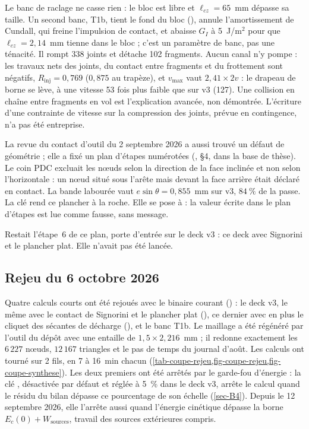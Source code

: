 Le banc de raclage ne casse rien : le bloc est libre et $\ell_{cz} = 65$~mm dépasse sa taille. Un second banc, T1b, tient le fond du bloc (), annule l'amortissement de Cundall, qui freine l'impulsion de contact, et abaisse $G_I$ à 5~J/m$^2$ pour que $\ell_{cz} = 2{,}14$~mm tienne dans le bloc ; c'est un paramètre de banc, pas une ténacité. Il rompt 338 joints et détache 102 fragments. Aucun canal n'y pompe : les travaux nets des joints, du contact entre fragments et du frottement sont négatifs, $R_\text{inj} = 0{,}769$ ($0{,}875$ au trapèze), et $v_\text{max}$ vaut $2{,}41 \times 2v$ : le drapeau de borne se lève, à une vitesse 53 fois plus faible que sur v3 (127). Une collision en chaîne entre fragments en vol est l'explication avancée, non démontrée. L'écriture d'une contrainte de vitesse sur la compression des joints, prévue en contingence, n'a pas été entreprise.

La revue du contact d'outil du 2 septembre 2026 a aussi trouvé un défaut de géométrie ; elle a fixé un plan d'étapes numérotées (, §4, dans la base de thèse). Le coin PDC excluait les nœuds selon la direction de la face inclinée et non selon l'horizontale : un nœud situé sous l'arête mais devant la face arrière était déclaré en contact. La bande labourée vaut $e\sin\theta = 0{,}855$~mm sur v3, $84~\%$ de la passe. La clé  rend ce plancher à la roche. Elle se pose à  : la valeur  écrite dans le plan d'étapes est lue comme fausse, sans message.

Restait l'étape~6 de ce plan, porte d'entrée sur le deck v3 : ce deck avec Signorini et le plancher plat. Elle n'avait pas été lancée.

\subsection{Rejeu du 6 octobre 2026}
\label{sec-coupe-rejeu}

Quatre calculs courts ont été rejoués avec le binaire courant () : le deck v3, le même avec le contact de Signorini et le plancher plat (), ce dernier avec en plus le cliquet des sécantes de décharge (), et le banc T1b. Le maillage  a été régénéré par l'outil du dépôt avec une entaille de $1{,}5 \times 2{,}216$~mm ; il redonne exactement les $6\,227$ nœuds, $12\,167$ triangles et le pas de temps du journal d'août. Les calculs ont tourné sur 2 fils, en 7 à 16~min chacun (\cref{tab-coupe-rejeu,fig-coupe-rejeu,fig-coupe-synthese}). Les deux premiers ont été arrêtés par le garde-fou d'énergie : la clé , désactivée par défaut et réglée à 5~\% dans le deck v3, arrête le calcul quand le résidu du bilan dépasse ce pourcentage de son échelle (\cref{sec-B4}). Depuis le 12 septembre 2026, elle l'arrête aussi quand l'énergie cinétique dépasse la borne $E_c(0) + W_\text{sources}$, travail des sources extérieures compris.


